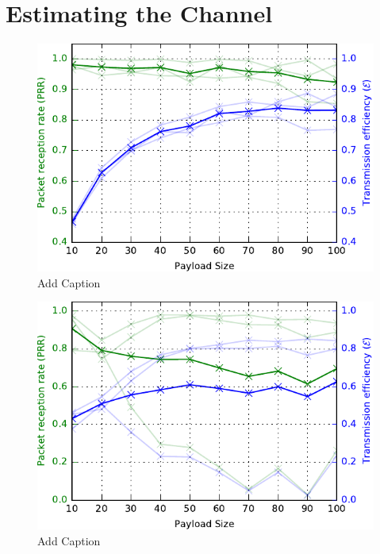 \section{Estimating the Channel}

\begin{figure}
\centering
\includegraphics[scale=1]{figs/35mTest.pdf} 
\caption{Add Caption}
\end{figure}
\begin{figure}
\centering
\includegraphics[scale=1]{figs/45mTest.pdf} 
\caption{Add Caption}
\end{figure}